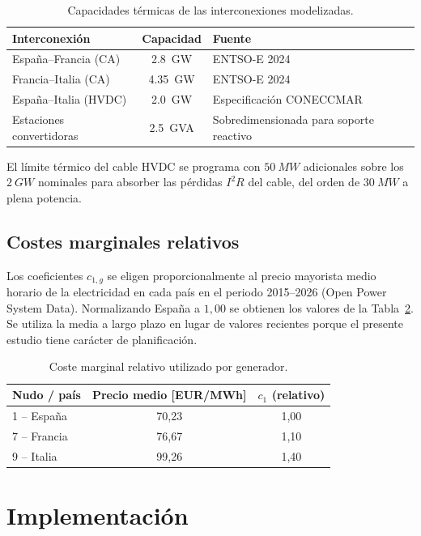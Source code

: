 \documentclass[12pt,a4paper]{iit-project-draft-report}
\begin{document}
\begin{table}[h]
\centering
\caption{Capacidades térmicas de las interconexiones modelizadas.}
\label{tab:lines}
\begin{tabular}{lcl}
\toprule
Interconexión & Capacidad & Fuente \\
\midrule
España--Francia (CA) & \SI{2.8}{GW} & ENTSO-E 2024 \\
Francia--Italia (CA) & \SI{4.35}{GW} & ENTSO-E 2024 \\
España--Italia (\gls{HVDC}) & \SI{2.0}{GW} & Especificación CONECCMAR \\
Estaciones convertidoras & \SI{2.5}{GVA} & Sobredimensionada para soporte reactivo \\
\bottomrule
\end{tabular}
\end{table}

El límite térmico del cable \gls{HVDC} se programa con
$\SI{50}{MW}$ adicionales sobre los $\SI{2}{GW}$ nominales para absorber
las pérdidas $I^2R$ del cable, del orden de $\SI{30}{MW}$ a plena potencia.

\subsection{Costes marginales relativos}

Los coeficientes $c_{1,g}$ se eligen proporcionalmente al precio
mayorista medio horario de la electricidad en cada país en el periodo
2015--2026 (Open Power System Data). Normalizando España a $1{,}00$ se
obtienen los valores de la Tabla~\ref{tab:cost}. Se utiliza la media a
largo plazo en lugar de valores recientes porque el presente estudio
tiene carácter de planificación.

\begin{table}[h]
\centering
\caption{Coste marginal relativo utilizado por generador.}
\label{tab:cost}
\begin{tabular}{lcc}
\toprule
Nudo / país & Precio medio [EUR/MWh] & $c_1$ (relativo) \\
\midrule
1 -- España & 70{,}23 & 1{,}00 \\
7 -- Francia & 76{,}67 & 1{,}10 \\
9 -- Italia & 99{,}26 & 1{,}40 \\
\bottomrule
\end{tabular}
\end{table}

\section{Implementación}
\label{sec:impl}
\end{document}
